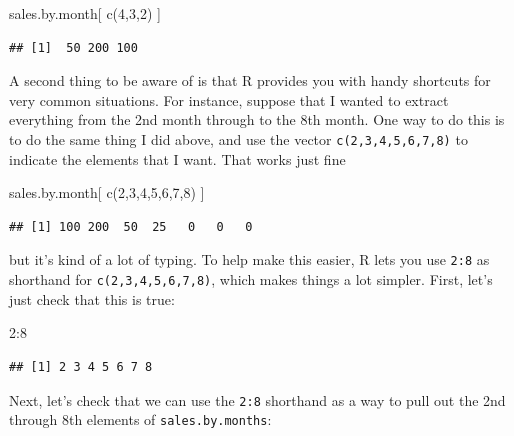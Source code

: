 \documentclass[
]{book}
\newenvironment{Shaded}{\begin{snugshade}}{\end{snugshade}}
\newcommand{\DecValTok}[1]{\textcolor[rgb]{0.00,0.00,0.81}{#1}}
\newcommand{\FunctionTok}[1]{\textcolor[rgb]{0.00,0.00,0.00}{#1}}
\newcommand{\NormalTok}[1]{#1}
\newcommand{\SpecialCharTok}[1]{\textcolor[rgb]{0.00,0.00,0.00}{#1}}
\begin{document}
\begin{Shaded}
\begin{Highlighting}[]
\NormalTok{sales.by.month[ }\FunctionTok{c}\NormalTok{(}\DecValTok{4}\NormalTok{,}\DecValTok{3}\NormalTok{,}\DecValTok{2}\NormalTok{) ]}
\end{Highlighting}
\end{Shaded}

\begin{verbatim}
## [1]  50 200 100
\end{verbatim}

A second thing to be aware of is that R provides you with handy shortcuts for very common situations. For instance, suppose that I wanted to extract everything from the 2nd month through to the 8th month. One way to do this is to do the same thing I did above, and use the vector \texttt{c(2,3,4,5,6,7,8)} to indicate the elements that I want. That works just fine

\begin{Shaded}
\begin{Highlighting}[]
\NormalTok{sales.by.month[ }\FunctionTok{c}\NormalTok{(}\DecValTok{2}\NormalTok{,}\DecValTok{3}\NormalTok{,}\DecValTok{4}\NormalTok{,}\DecValTok{5}\NormalTok{,}\DecValTok{6}\NormalTok{,}\DecValTok{7}\NormalTok{,}\DecValTok{8}\NormalTok{) ]}
\end{Highlighting}
\end{Shaded}

\begin{verbatim}
## [1] 100 200  50  25   0   0   0
\end{verbatim}

but it's kind of a lot of typing. To help make this easier, R lets you use \texttt{2:8} as shorthand for \texttt{c(2,3,4,5,6,7,8)}, which makes things a lot simpler. First, let's just check that this is true:

\begin{Shaded}
\begin{Highlighting}[]
\DecValTok{2}\SpecialCharTok{:}\DecValTok{8}
\end{Highlighting}
\end{Shaded}

\begin{verbatim}
## [1] 2 3 4 5 6 7 8
\end{verbatim}

Next, let's check that we can use the \texttt{2:8} shorthand as a way to pull out the 2nd through 8th elements of \texttt{sales.by.months}:
\end{document}
